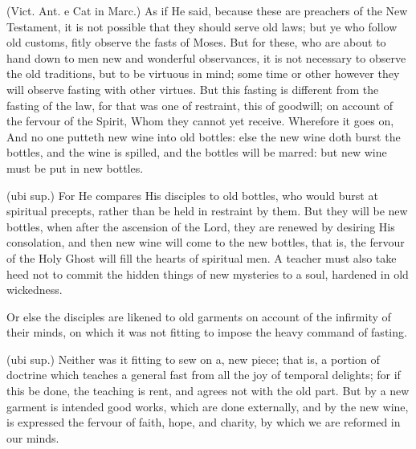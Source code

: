  (Vict. Ant. e Cat in Marc.) As if He said, because these are preachers of the New Testament, it is not possible that they should serve old laws; but ye who follow old customs, fitly observe the fasts of Moses. But for these, who are about to hand down to men new and wonderful observances, it is not necessary to observe the old traditions, but to be virtuous in mind; some time or other however they will observe fasting with other virtues. But this fasting is different from the fasting of the law, for that was one of restraint, this of goodwill; on account of the fervour of the Spirit, Whom they cannot yet receive. Wherefore it goes on, And no one putteth new wine into old bottles: else the new wine doth burst the bottles, and the wine is spilled, and the bottles will be marred: but new wine must be put in new bottles.

 (ubi sup.) For He compares His disciples to old bottles, who would burst at spiritual precepts, rather than be held in restraint by them. But they will be new bottles, when after the ascension of the Lord, they are renewed by desiring His consolation, and then new wine will come to the new bottles, that is, the fervour of the Holy Ghost will fill the hearts of spiritual men. A teacher must also take heed not to commit the hidden things of new mysteries to a soul, hardened in old wickedness.

 Or else the disciples are likened to old garments on account of the infirmity of their minds, on which it was not fitting to impose the heavy command of fasting.

 (ubi sup.) Neither was it fitting to sew on a, new piece; that is, a portion of doctrine which teaches a general fast from all the joy of temporal delights; for if this be done, the teaching is rent, and agrees not with the old part. But by a new garment is intended good works, which are done externally, and by the new wine, is expressed the fervour of faith, hope, and charity, by which we are reformed in our minds.

 

